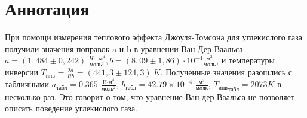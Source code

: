 \chapter*{Аннотация}

При помощи измерения теплового эффекта Джоуля-Томсона для углекислого газа получили значения поправок a и b в уравнении Ван-Дер-Ваальса:  
$a  = (1,484 \pm 0,242) \  \frac{H\cdot\text{ м} ^4}{\text{моль} ^2}, b = (8,09 \pm 1,86) \cdot 10^{-4} \frac{\text{м} ^3}{\text{моль}}$, и температуры инверсии $T_{\text{инв}} = \frac{2a}{Rb} = (441,3 \pm 124,3) \ K$. Полученные значения разошлись с табличными $a_{\text{табл}} = 0.365$ $\frac{\text{Н·м}^4}{\text{моль}^2}$, $b_{\text{табл}} = 42.79 \times 10^{-4}$ $\frac{\text{м}^3}{\text{моль}}$, ${T_{\text{инв}}}_{\text{табл}} = 2073 K$ в несколько раз. Это говорит о том, что уравнение Ван-дер-Ваальса не позволяет описать поведение углекислого газа.